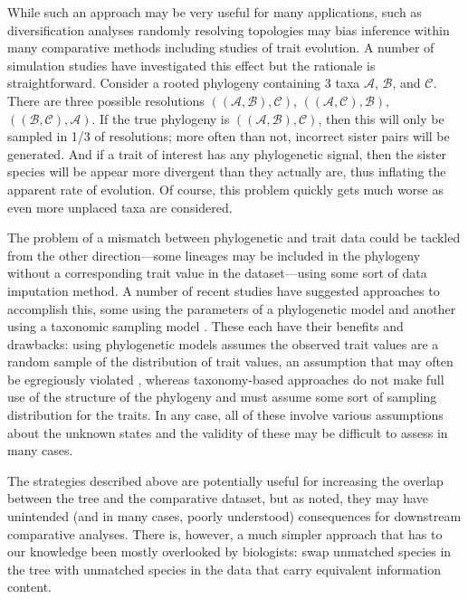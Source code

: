 \documentclass[a4paper,11pt]{article}
\begin{document}
While such an approach may be very useful for many applications, such as diversification analyses \citep{Kuhn2011, Rabosky2015} randomly resolving topologies may bias inference within many comparative methods including studies of trait evolution. A number of simulation studies have investigated this effect \citep{Losos1994, Martins1996, Davies2012, Bapst2014, Rabosky2015} but the rationale is straightforward. Consider a rooted phylogeny containing 3 taxa $\mathcal{A}$, $\mathcal{B}$, and $\mathcal{C}$. There are three possible resolutions $((\mathcal{A},\mathcal{B}),\mathcal{C})$, $((\mathcal{A},\mathcal{C}),\mathcal{B})$, $((\mathcal{B},\mathcal{C}),\mathcal{A})$. If the true phylogeny is $((\mathcal{A},\mathcal{B}),\mathcal{C})$, then this will only be sampled in 1/3 of resolutions; more often than not, incorrect sister pairs will be generated. And if a trait of interest has any phylogenetic signal, then the sister species will be appear more divergent than they actually are, thus inflating the apparent rate of evolution. Of course, this problem quickly gets much worse as even more unplaced taxa are considered.

The problem of a mismatch between phylogenetic and trait data could be tackled from the other direction---some lineages may be included in the phylogeny without a corresponding trait value in the dataset---using some sort of data imputation method. A number of recent studies have suggested approaches to accomplish this, some using the parameters of a phylogenetic model \citep{Fagan2013, Swenson2014, PEM} and another using a taxonomic sampling model \citep{FitzJohn2014}. These each have their benefits and drawbacks: using phylogenetic models assumes the observed trait values are a random sample of the distribution of trait values, an assumption that may often be egregiously violated \citep{FitzJohn2014}, whereas taxonomy-based approaches do not make full use of the structure of the phylogeny and must assume some sort of sampling distribution for the traits. In any case, all of these involve various assumptions about the unknown states and the validity of these may be difficult to assess in many cases.

The strategies described above are potentially useful for increasing the overlap between the tree and the comparative dataset, but as noted, they may have unintended (and in many cases, poorly understood) consequences for downstream comparative analyses. There is, however, a much simpler approach that has to our knowledge been mostly overlooked by biologists: swap unmatched species in the tree with unmatched species in the data that carry equivalent information content. 
\end{document}
